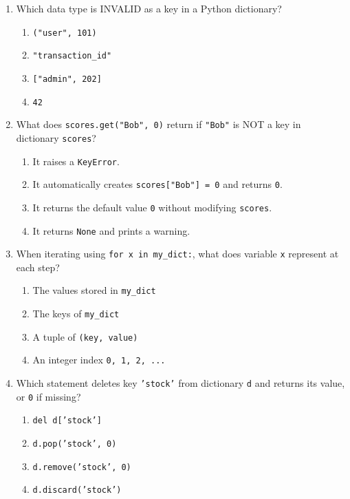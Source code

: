 \documentclass[11pt,a4paper]{article}
\begin{document}
\newpage
\begin{enumerate}[label=\textbf{Q\arabic*.},leftmargin=2em,itemsep=1.5pt,topsep=1pt,resume]
\item Which data type is INVALID as a key in a Python dictionary?
\begin{enumerate}[label=\Alph*.,leftmargin=2em]
\item \texttt{("user", 101)}
\item \texttt{"transaction\_id"}
\item \texttt{["admin", 202]}
\item \texttt{42}
\end{enumerate}
\item What does \texttt{scores.get("Bob", 0)} return if \texttt{"Bob"} is NOT a key in dictionary \texttt{scores}?
\begin{enumerate}[label=\Alph*.,leftmargin=2em]
\item It raises a \texttt{KeyError}.
\item It automatically creates \texttt{scores["Bob"] = 0} and returns \texttt{0}.
\item It returns the default value \texttt{0} without modifying \texttt{scores}.
\item It returns \texttt{None} and prints a warning.
\end{enumerate}
\item When iterating using \texttt{for x in my\_dict:}, what does variable \texttt{x} represent at each step?
\begin{enumerate}[label=\Alph*.,leftmargin=2em]
\item The values stored in \texttt{my\_dict}
\item The keys of \texttt{my\_dict}
\item A tuple of \texttt{(key, value)}
\item An integer index \texttt{0, 1, 2, ...}
\end{enumerate}
\item Which statement deletes key \texttt{'stock'} from dictionary \texttt{d} and returns its value, or \texttt{0} if missing?
\begin{enumerate}[label=\Alph*.,leftmargin=2em]
\item \texttt{del d['stock']}
\item \texttt{d.pop('stock', 0)}
\item \texttt{d.remove('stock', 0)}
\item \texttt{d.discard('stock')}
\end{enumerate}

\end{enumerate}
\end{document}
